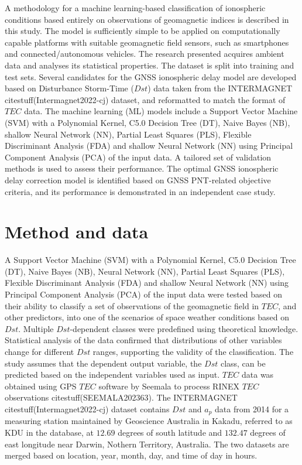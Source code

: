 \let\LaTeXcline\cline\documentclass[sn-mathphys-num]{sn-jnl}\let\cline\LaTeXcline
\begin{document}
A methodology for a machine learning-based classification of ionospheric conditions based entirely on observations of geomagnetic indices is described in this study. The model is sufficiently simple to be applied on computationally capable platforms with suitable geomagnetic field sensors, such as smartphones and connected/autonomous vehicles. The research presented acquires ambient data and analyses its statistical properties. The dataset is split into training and test sets. Several candidates for the GNSS ionospheric delay model are developed based on Disturbance Storm-Time ($Dst$) data taken from the INTERMAGNET citestuff(Intermagnet2022-cj) dataset, and reformatted to match the format of $TEC$ data. The machine learning (ML) models include a Support Vector Machine (SVM) with a Polynomial Kernel, C5.0 Decision Tree (DT), Naive Bayes (NB), shallow Neural Network (NN), Partial Least Squares (PLS), Flexible Discriminant Analysis (FDA) and shallow Neural Network (NN) using Principal Component Analysis (PCA) of the input data. A tailored set of validation methods is used to assess their performance. The optimal GNSS ionospheric delay correction model is identified based on GNSS PNT-related objective criteria, and its performance is demonstrated in an independent case study.

\section{Method and data}
\label{sec:Dataset}

A Support Vector Machine (SVM) with a Polynomial Kernel, C5.0 Decision Tree (DT), Naive Bayes (NB), Neural Network (NN), Partial Least Squares (PLS), Flexible Discriminant Analysis (FDA) and shallow Neural Network (NN) using Principal Component Analysis (PCA) of the input data were tested based on their ability to classify a set of observations of the geomagnetic field in $TEC$, and other predictors, into one of the scenarios of space weather conditions based on $Dst$. Multiple $Dst$-dependent classes were predefined using theoretical knowledge. Statistical analysis of the data confirmed that distributions of other variables change for different $Dst$ ranges, supporting the validity of the classification. The study assumes that the dependent output variable, the $Dst$ class, can be predicted based on the independent variables used as input. $TEC$ data was obtained using GPS $TEC$ software by Seemala to process RINEX $TEC$ observations citestuff(SEEMALA202363). The INTERMAGNET citestuff(Intermagnet2022-cj) dataset contains $Dst$ and $a_{p}$ data from 2014 for a measuring station maintained by Geoscience Australia in Kakadu, referred to as KDU in the database, at $12.69$ degrees of south latitude and $132.47$ degrees of east longitude near Darwin, Nothern Territory, Australia. The two datasets are merged based on location, year, month, day, and time of day in hours.
\end{document}
